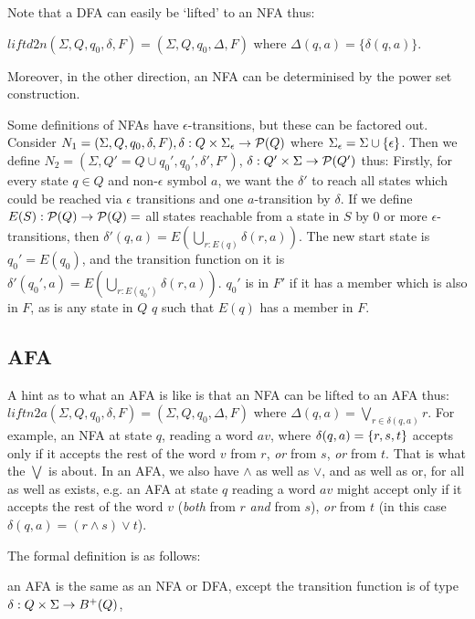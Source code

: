 \noindent Note that a DFA can easily be `lifted' to an NFA thus:

$\mathit{liftd2n} (\Sigma, Q, q_0, \delta, F) = (\Sigma, Q, q_0, \Delta, F)$ where $\Delta(q, a) = \{\delta(q,a)\}$.

\noindent Moreover, in the other direction, an NFA can be determinised by the power set construction.

Some definitions of NFAs have $\epsilon$-transitions, but these can be factored out. Consider $N_1 = (\Sigma, Q, q_0, \delta, F), \delta:  Q \times \Sigma_\epsilon \to \mathcal{P}(Q)$ where $\Sigma_\epsilon = \Sigma \cup \{\epsilon\}$. Then we define $N_2 = (\Sigma, Q' = Q \cup q_0', q_0', \delta', F')$, $\delta:  Q' \times \Sigma \to \mathcal{P}(Q')$ thus:
Firstly, for every state $q \in Q$ and non-$\epsilon$ symbol $a$, we want the $\delta'$ to reach all states which could be reached via $\epsilon$ transitions and one $a$-transition by $\delta$. If we define $E(S): \mathcal{P}(Q) \to \mathcal{P}(Q) =$ all states reachable from a state in $S$ by 0 or more $\epsilon$-transitions, then
$\delta'(q,a) = E(\bigcup_{r: E({q})} \delta(r,a))$. The new start state is $q_0' = E(q_0)$, and the transition function on it is $\delta'(q_0',a) = E(\bigcup_{r: E(q_0')} \delta(r,a)) $. $q_0'$ is in $F'$ if it has a member which is also in $F$, as is any state in $Q$ $q$ such that $E(q)$ has a member in $F$.


\subsection{AFA}


A hint as to what an AFA is like is that an NFA can be lifted to an AFA thus:
$\mathit{liftn2a} (\Sigma, Q, q_0, \delta, F) = (\Sigma, Q, q_0, \Delta, F)$ where $\Delta(q, a) = \bigvee_{r \in \delta(q,a)} r$.
\noindent For example, an NFA at state $q$, reading a word $av$, where $\delta(q,a) = \{r, s, t\}$ accepts only if it accepts the rest of the word $v$ from $r$, \textit{or} from $s$, \textit{or} from $t$. That is what the $\bigvee$ is about. In an AFA, we also have $\land$ as well as $\lor$, and as well as or, for all as well as exists, e.g. an AFA at state $q$ reading a word $av$ might accept only if it accepts the rest of the word $v$ (\textit{both} from $r$ \textit{and} from $s$), \textit{or} from $t$ (in this case $\delta(q,a) = (r \land s) \lor t$).

The formal definition is as follows:
\begin{defn} \label{defn:afa}
an AFA is the same as an NFA or DFA, except the transition function is of type $\delta: Q \times \Sigma \to B^{+}(Q)$, \end{defn}


